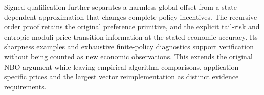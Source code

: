 \documentclass[ecta,nameyear,draft]{econsocart}
\begin{document}
Signed qualification further separates a harmless global offset from a state-dependent approximation that changes complete-policy incentives. The recursive order proof retains the original preference primitive, and the explicit tail-risk and entropic moduli price transition information at the stated economic accuracy. Its sharpness examples and exhaustive finite-policy diagnostics support verification without being counted as new economic observations. This extends the original NBO argument while leaving empirical algorithm comparisons, application-specific prices and the largest vector reimplementation as distinct evidence requirements.



\end{document}
